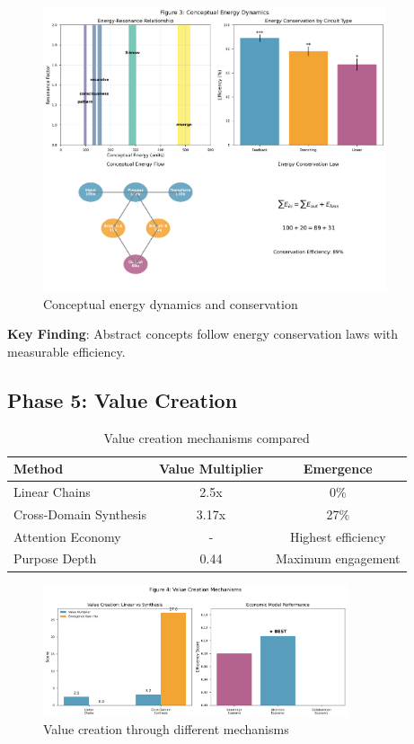 \documentclass[11pt,a4paper]{article}
\begin{document}
\begin{figure}[H]
\centering
\includegraphics[width=0.9\textwidth]{paper_figure_3_energy.png}
\caption{Conceptual energy dynamics and conservation}
\end{figure}

\textbf{Key Finding}: Abstract concepts follow energy conservation laws with measurable efficiency.

\subsection{Phase 5: Value Creation}

\begin{table}[H]
\centering
\caption{Value creation mechanisms compared}
\begin{tabular}{@{}lcc@{}}
\toprule
Method & Value Multiplier & Emergence \\
\midrule
Linear Chains & 2.5x & 0\% \\
Cross-Domain Synthesis & 3.17x & 27\% \\
Attention Economy & - & Highest efficiency \\
Purpose Depth & 0.44 & Maximum engagement \\
\bottomrule
\end{tabular}
\end{table}

\begin{figure}[H]
\centering
\includegraphics[width=0.8\textwidth]{paper_figure_4_value.png}
\caption{Value creation through different mechanisms}
\end{figure}
\end{document}
